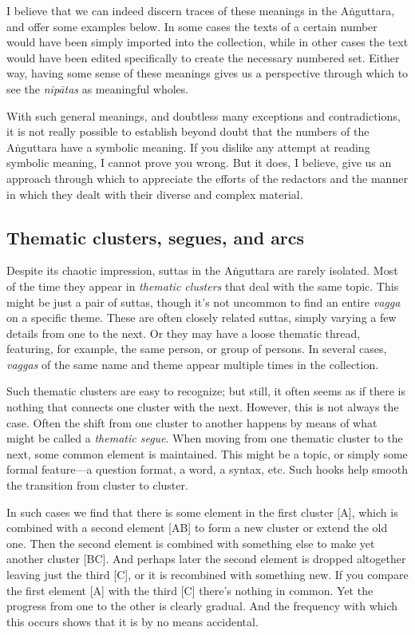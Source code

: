 \documentclass[12pt,openany]{book}%
\begin{document}
I believe that we can indeed discern traces of these meanings in the \textsanskrit{Aṅguttara}, and offer some examples below. In some cases the texts of a certain number would have been simply imported into the collection, while in other cases the text would have been edited specifically to create the necessary numbered set. Either way, having some sense of these meanings gives us a perspective through which to see the \textit{\textsanskrit{nipātas}} as meaningful wholes.

With such general meanings, and doubtless many exceptions and contradictions, it is not really possible to establish beyond doubt that the numbers of the \textsanskrit{Aṅguttara} have a symbolic meaning. If you dislike any attempt at reading symbolic meaning, I cannot prove you wrong. But it does, I believe, give us an approach through which to appreciate the efforts of the redactors and the manner in which they dealt with their diverse and complex material.

\subsection*{Thematic clusters, segues, and arcs}

Despite its chaotic impression, suttas in the \textsanskrit{Aṅguttara} are rarely isolated. Most of the time they appear in \emph{thematic clusters} that deal with the same topic. This might be just a pair of suttas, though it’s not uncommon to find an entire \textit{vagga} on a specific theme. These are often closely related suttas, simply varying a few details from one to the next. Or they may have a loose thematic thread, featuring, for example, the same person, or group of persons. In several cases, \textit{vaggas} of the same name and theme appear multiple times in the collection.

Such thematic clusters are easy to recognize; but still, it often seems as if there is nothing that connects one cluster with the next. However, this is not always the case. Often the shift from one cluster to another happens by means of what might be called a \emph{thematic segue}. When moving from one thematic cluster to the next, some common element is maintained. This might be a topic, or simply some formal feature—a question format, a word, a syntax, etc. Such hooks help smooth the transition from cluster to cluster.

In such cases we find that there is some element in the first cluster [A], which is combined with a second element [AB] to form a new cluster or extend the old one. Then the second element is combined with something else to make yet another cluster [BC]. And perhaps later the second element is dropped altogether leaving just the third [C], or it is recombined with something new. If you compare the first element [A] with the third [C] there’s nothing in common. Yet the progress from one to the other is clearly gradual. And the frequency with which this occurs shows that it is by no means accidental.
\end{document}
